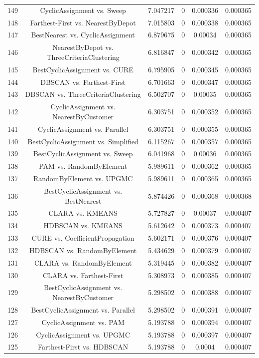 \documentclass[a4paper,10pt]{article}
\begin{document}
\begin{landscape}
\begin{table}[!htp]
\begin{tabular}{cccccc}
149&CyclicAssignment vs. Sweep&7.047217&0&0.000336&0.000365\\
148&Farthest-First vs. NearestByDepot&7.015803&0&0.000338&0.000365\\
147&BestNearest vs. CyclicAssignment&6.879675&0&0.00034&0.000365\\
146&NearestByDepot vs. ThreeCriteriaClustering&6.816847&0&0.000342&0.000365\\
145&BestCyclicAssignment vs. CURE&6.795905&0&0.000345&0.000365\\
144&DBSCAN vs. Farthest-First&6.701663&0&0.000347&0.000365\\
143&DBSCAN vs. ThreeCriteriaClustering&6.502707&0&0.00035&0.000365\\
142&CyclicAssignment vs. NearestByCustomer&6.303751&0&0.000352&0.000365\\
141&CyclicAssignment vs. Parallel&6.303751&0&0.000355&0.000365\\
140&BestCyclicAssignment vs. Simplified&6.115267&0&0.000357&0.000365\\
139&BestCyclicAssignment vs. Sweep&6.041968&0&0.00036&0.000365\\
138&PAM vs. RandomByElement&5.989611&0&0.000362&0.000365\\
137&RandomByElement vs. UPGMC&5.989611&0&0.000365&0.000365\\
136&BestCyclicAssignment vs. BestNearest&5.874426&0&0.000368&0.000368\\
135&CLARA vs. KMEANS&5.727827&0&0.00037&0.000407\\
134&HDBSCAN vs. KMEANS&5.612642&0&0.000373&0.000407\\
133&CURE vs. CoefficientPropagation&5.602171&0&0.000376&0.000407\\
132&HDBSCAN vs. RandomByElement&5.434629&0&0.000379&0.000407\\
131&CLARA vs. RandomByElement&5.319445&0&0.000382&0.000407\\
130&CLARA vs. Farthest-First&5.308973&0&0.000385&0.000407\\
129&BestCyclicAssignment vs. NearestByCustomer&5.298502&0&0.000388&0.000407\\
128&BestCyclicAssignment vs. Parallel&5.298502&0&0.000391&0.000407\\
127&CyclicAssignment vs. PAM&5.193788&0&0.000394&0.000407\\
126&CyclicAssignment vs. UPGMC&5.193788&0&0.000397&0.000407\\
125&Farthest-First vs. HDBSCAN&5.193788&0&0.0004&0.000407\\

\end{tabular}
\end{table}
\end{landscape}
\end{document}
